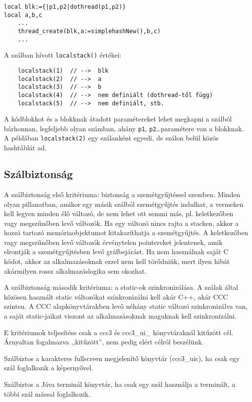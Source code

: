 \begin{verbatim}
local blk:={|p1,p2|dothread(p1,p2)} 
local a,b,c
    ...
    thread_create(blk,a:=simplehashNew(),b,c)
    ...
\end{verbatim}
A szálban hívott \verb!localstack()! értékei:
\begin{verbatim}
    localstack(1)  // -->  blk
    localstack(2)  // -->  a
    localstack(3)  // -->  b
    localstack(4)  // -->  nem definiált (dothread-től függ)
    localstack(5)  // -->  nem definiált, stb.
\end{verbatim}
A kódblokkot és a blokknak átadott paramétereket lehet megkapni
a szálból bárhonnan, legfeljebb olyan számban,
ahány \verb!p1!, \verb!p2!\ldots paramétere van a blokknak.
A példában \verb!localstack(2)! egy szálanként egyedi, 
de szálon belül közös hashtáblát ad.


\subsection{Szálbiztonság}

A szálbiztonság első kritériuma: biztonság a szemétgyűjtéssel szemben. 
Minden olyan pillanatban, amikor egy másik szálból szemétgyűjtés indulhat, 
a vermeken kell legyen minden élő változó, de nem lehet ott semmi más,
pl. keletkezőben vagy megszűnőben levő változók. Ha egy változó nincs
rajta a stacken, akkor a hozzá tartozó memóriaobjektumot kitakaríthatja
a szemétgyűjtés. A keletkezőben vagy megszűnőben levő változók érvénytelen
pointereket jelentenek, amik elrontják a szemétgyűjtésben levő gráfbejárást.
Ha nem használnak saját C kódot, akkor az alkalmazásoknak ezzel nem kell 
törődniük, mert ilyen hibát  akármilyen rossz alkalmazáslogika sem okozhat. 

A szálbiztonság második kritériuma: a static-ok szinkronizálása.
A szálak által közösen használt static változókat szinkronizálni 
kell akár C++, akár CCC szinten. A CCC alapkönyvtárakben levő néhány 
static változó szinkronizálva van, a saját static-jaikat viszont
az alkalmazásoknak maguknak kell szinkronizálni.

E kritériumok teljesítése csak a ccc3 és ccc3\_ui\_ könyvtáraknál kitűzött cél. 
Árnyaltan fogalmazva ,,kitűzött'', nem pedig elért célról beszélünk.

Szálbiztos a karakteres fullscreen megjelenítő könyvtár (ccc3\_uic),
ha csak egy szál foglalkozik a képernyővel.

Szálbiztos a Jáva terminál könyvtár, 
ha csak egy szál használja a terminált, a többi szál mással foglalkozik.

